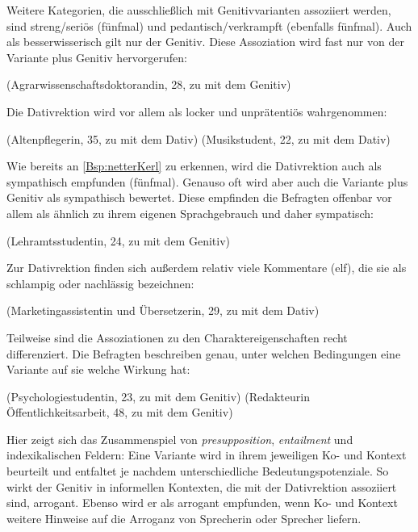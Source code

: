 Weitere Kategorien, die ausschließlich mit Genitivvarianten assoziiert werden, sind \glqq streng/seriös\grqq{} (fünfmal) und \glqq pedantisch/verkrampft\grqq{} (ebenfalls fünfmal). 
Auch als besserwisserisch gilt nur der Genitiv. 
Diese Assoziation wird fast nur von der Variante \wegen{} plus Genitiv hervorgerufen:
\begin{exe}
\ex {} (Agrarwissenschaftsdoktorandin, 28, zu \wegen{} mit dem Genitiv)
\end{exe}
Die Dativrektion wird vor allem als locker und unprätentiös wahrgenommen:
\begin{exe}
\ex {} (Altenpflegerin, 35, zu \gegenueber{} mit dem Dativ)
\ex {} (Musikstudent, 22, zu \waehrend{} mit dem Dativ) \label{Bsp:netterKerl}
\end{exe}
Wie bereits an \autoref{Bsp:netterKerl} zu erkennen, wird die Dativrektion auch als sympathisch empfunden (fünfmal). 
Genauso oft wird aber auch die Variante \waehrend{} plus Genitiv als sympathisch bewertet.
Diese empfinden die Befragten offenbar vor allem als ähnlich zu ihrem eigenen Sprachgebrauch und daher sympatisch:
\begin{exe}
\ex {} (Lehramtsstudentin, 24, zu \waehrend{} mit dem Genitiv)
\end{exe} 
Zur Dativrektion finden sich außerdem relativ viele Kommentare (elf), die sie als schlampig oder nachlässig bezeichnen: 
\begin{exe}
\ex {} (Marketingassistentin und Übersetzerin, 29, zu \dank{} mit dem Dativ)
\end{exe}
Teilweise sind die Assoziationen zu den Charaktereigenschaften recht differenziert. 
Die Befragten beschreiben genau, unter welchen Bedingungen eine Variante auf sie welche Wirkung hat: 
\begin{exe}
\ex {} (Psychologiestudentin, 23, zu \wegen{} mit dem Genitiv)
\ex {} (Redakteurin Öffentlichkeitsarbeit, 48, zu \waehrend{} mit dem Genitiv) 
\end{exe}
Hier zeigt sich das Zusammenspiel von \textit{presupposition}, \textit{entailment} und indexikalischen Feldern: 
Eine Variante wird in ihrem jeweiligen Ko- und Kontext beurteilt und entfaltet je nachdem unterschiedliche Bedeutungspotenziale.
So wirkt der Genitiv in informellen Kontexten, die mit der Dativrektion assoziiert sind, arrogant. 
Ebenso wird er als arrogant empfunden, wenn Ko- und Kontext weitere Hinweise auf die Arroganz von Sprecherin oder Sprecher liefern. 

